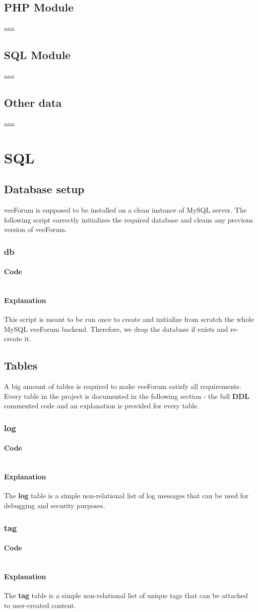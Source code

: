 \documentclass[12pt]{report}
\renewcommand\emph{\textbf}
\newcommand{\printSQLtest}[1]
{
    \inputminted[linenos, breaklines, breakbytoken, tabsize=4, fontsize=\footnotesize]{mysql}{#1}
}
\newcommand{\printSQLTablepage}[2]
{
    \newpage
    \subsection{#2}
    \subsubsection{Code}
    \printSQLtest{../sql/parts/#1}
    \subsubsection{Explanation}
}
\begin{document}
            \section{PHP Module}
                aaa

            \section{SQL Module}
                aaa

            \section{Other data}
                aaa

        \chapter{SQL}

            \newpage
            \section{Database setup}

                veeForum is supposed to be installed on a clean instance of MySQL server. The following script correctly initializes the required database and cleans any previous version of veeForum.

                \printSQLTablepage{00_db.sql}{db}
                    This script is meant to be run once to create and initialize from scratch the whole MySQL veeForum backend.
                    Therefore, we drop the database if exists and re-create it.

            \newpage
            \section{Tables}

                A big amount of tables is required to make veeForum satisfy all requirements. Every table in the project is documented in the following section - the full \emph{DDL} commented code and an explanation is provided for every table.

                \printSQLTablepage{01_tblLog.sql}{log}
                    The \emph{log} table is a simple non-relational list of log messages that can be used for debugging and security purposes.

                \printSQLTablepage{02_tblTag.sql}{tag}
                    The \emph{tag} table is a simple non-relational list of unique tags that can be attached to user-created content.
\end{document}
